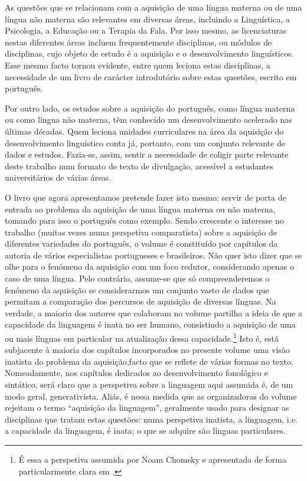 \begin{refsection}

As questões que se relacionam com a aquisição de uma língua materna ou de uma língua não materna são relevantes em diversas áreas, incluindo a Linguística, a Psicologia, a Educação ou a Terapia da Fala. Por isso mesmo, as licenciaturas nestas diferentes áreas incluem frequentemente disciplinas, ou módulos de disciplinas, cujo objeto de estudo é a aquisição e o desenvolvimento linguísticos. Esse mesmo facto tornou evidente, entre quem leciona estas disciplinas, a necessidade de um livro de carácter introdutório sobre estas questões, escrito em português.

Por outro lado, os estudos sobre a aquisição do português, como língua materna ou como língua não materna, têm conhecido um desenvolvimento acelerado nas últimas décadas. Quem leciona unidades curriculares na área da aquisição do desenvolvimento linguístico conta já, portanto, com um conjunto relevante de dados e estudos. Fazia-se, assim, sentir a necessidade de coligir parte relevante deste trabalho num formato de texto de divulgação, acessível a estudantes universitários de várias áreas. 

O livro que agora apresentamos pretende fazer isto mesmo: servir de porta de entrada ao problema da aquisição de uma língua materna ou não materna, tomando para isso o português como exemplo. Sendo crescente o interesse no trabalho (muitas vezes numa perspetiva comparatista) sobre a aquisição de diferentes variedades do português, o volume é constituído por capítulos da autoria de vários especialistas portugueses e brasileiros. Não quer isto dizer que se olhe para o fenómeno da aquisição com um foco redutor, considerando apenas o caso de uma língua. Pelo contrário, assume-se que só compreenderemos o fenómeno da aquisição se considerarmos um conjunto vasto de dados que permitam a comparação dos percursos de aquisição de diversas línguas. Na verdade, a maioria dos autores que colaboram no volume partilha a ideia de que a capacidade da linguagem é inata no ser humano, consistindo a aquisição de uma ou mais línguas em particular na atualização dessa capacidade.\footnote{É essa a perspetiva assumida por Noam Chomsky e apresentada de forma particularmente clara em \citet{chomsky1986}.} Isto é, está subjacente à maioria dos capítulos incorporados no presente volume uma visão inatista do problema da aquisição,\largerpage facto que se reflete de várias formas no texto. Nomeadamente, nos capítulos dedicados ao desenvolvimento fonológico e sintático, será claro que a  perspetiva sobre a linguagem aqui assumida é, de um modo geral, generativista. Aliás, é nessa medida que as organizadoras do volume rejeitam o termo ``aquisição da linguagem'', geralmente usado para designar as disciplinas que tratam estas questões: numa perspetiva inatista, a linguagem, i.e. a capacidade da linguagem, é inata; o que se adquire são línguas particulares.


\end{refsection}

